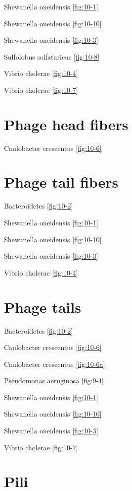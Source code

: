 \documentclass[]{tufte-book}
\begin{document}
Shewanella oneidensis \ref{fig:10-1}

Shewanella oneidensis \ref{fig:10-10}

Shewanella oneidensis \ref{fig:10-3}

Sulfolobus solfataricus \ref{fig:10-8}

Vibrio cholerae \ref{fig:10-4}

Vibrio cholerae \ref{fig:10-7}

\hypertarget{phage-head-fibers}{%
\section*{Phage head fibers}\label{phage-head-fibers}}

Caulobacter crescentus \ref{fig:10-6}

\hypertarget{phage-tail-fibers}{%
\section*{Phage tail fibers}\label{phage-tail-fibers}}

Bacteroidetes \ref{fig:10-2}

Shewanella oneidensis \ref{fig:10-1}

Shewanella oneidensis \ref{fig:10-10}

Shewanella oneidensis \ref{fig:10-3}

Vibrio cholerae \ref{fig:10-4}

\hypertarget{phage-tails}{%
\section*{Phage tails}\label{phage-tails}}

Bacteroidetes \ref{fig:10-2}

Caulobacter crescentus \ref{fig:10-6}

Caulobacter crescentus \ref{fig:10-6a}

Pseudomonas aeruginosa \ref{fig:9-4}

Shewanella oneidensis \ref{fig:10-1}

Shewanella oneidensis \ref{fig:10-10}

Shewanella oneidensis \ref{fig:10-3}

Vibrio cholerae \ref{fig:10-7}

\hypertarget{pili}{%
\section*{Pili}\label{pili}}
\end{document}
